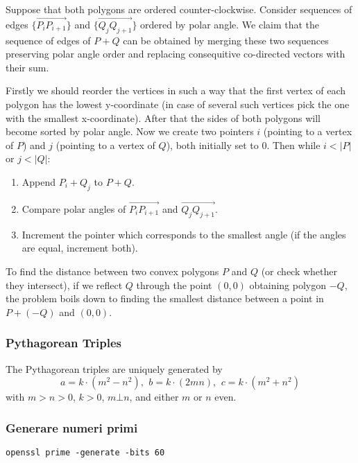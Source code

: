 Suppose that both polygons are ordered counter-clockwise. Consider sequences of edges $\{\overrightarrow{P_iP_{i+1}}\}$
and $\{\overrightarrow{Q_jQ_{j+1}}\}$ ordered by polar angle. We claim that the sequence of edges of $P + Q$ can be obtained by merging
these two sequences preserving polar angle order and replacing consequitive co-directed vectors with their sum.

Firstly we should reorder the vertices in such a way that the first vertex
of each polygon has the lowest y-coordinate (in case of several such vertices pick the one with the smallest x-coordinate). After that the sides of both polygons
will become sorted by polar angle.
Now we create two pointers $i$ (pointing to a vertex of $P$) and $j$ (pointing to a vertex of $Q$), both initially set to 0.
Then while $i < |P|$ or $j < |Q|$:
\begin{enumerate}
\item Append $P_i + Q_j$ to $P + Q$.
\item Compare polar angles of $\overrightarrow{P_iP_{i + 1}}$ and $\overrightarrow{Q_jQ_{j+1}}$.
\item Increment the pointer which corresponds to the smallest angle (if the angles are equal, increment both).
\end{enumerate}

To find the distance between two convex polygons $P$ and $Q$ (or check whether they intersect), if we reflect $Q$ through the point $(0, 0)$ obtaining polygon $-Q$, the problem boils down to finding the smallest distance between a point in
$P + (-Q)$ and $(0, 0)$.
\subsubsection{Pythagorean Triples}
 The Pythagorean triples are uniquely generated by $$a=k\cdot (m^{2}-n^{2}),\ \,b=k\cdot (2mn),\ \,c=k\cdot (m^{2}+n^{2})$$
 with $m > n > 0$, $k > 0$, $m \bot n$, and either $m$ or $n$ even.

\subsubsection{Generare numeri primi}
\verb|openssl prime -generate -bits 60|

